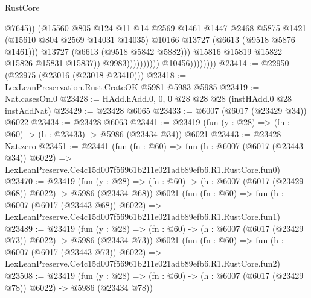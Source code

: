 \begin{lexlean}{RustCore}
\begin{coremodule}
                                                  @7645))
                                              (@15560
                                                @805
                                                @124
                                                @11
                                                @14
                                                @2569
                                                @1461
                                                @1447
                                                @2468
                                                @5875
                                                @1421
                                                (@15610 @804 @2569 @14031 @14035)
                                                @10166
                                                @13727
                                                (@6613 (@9518 @5876 @1461)))
                                              @13727
                                              (@6613 (@9518 @5842 @5882)))
                                            @15816
                                            @15819
                                            @15822
                                            @15826
                                            @15831
                                            @15837))
                                        @9983))))))))))
                    @10456))))))))
@23414 := @22950 (@22975 (@23016 (@23018 @23410)))
@23418 := LexLeanPreservation.Rust.CrateOK @5981 @5983 @5985
@23419 := Nat.casesOn.{0}
@23428 := HAdd.hAdd.{0, 0, 0} @28 @28 @28 (instHAdd.{0} @28 instAddNat)
@23429 := @23428 @6065
@23433 := @6007 (@6017 (@23429 @34)) @6022
@23434 := @23428 @6063
@23441 := @23419 (fun (y : @28) => (fn : @60) -> (h : @23433) -> @5986 (@23434 @34)) @6021
@23443 := @23428 Nat.zero
@23451 := @23441
    (fun (fn : @60) =>
    fun (h : @6007 (@6017 (@23443 @34)) @6022) =>
    LexLeanPreserve.Ce4c15d007f56961b211e021adb89efb6.R1.RustCore.fun0)
@23470 := @23419
    (fun (y : @28) => (fn : @60) -> (h : @6007 (@6017 (@23429 @68)) @6022) -> @5986 (@23434 @68))
    @6021
    (fun (fn : @60) =>
    fun (h : @6007 (@6017 (@23443 @68)) @6022) =>
    LexLeanPreserve.Ce4c15d007f56961b211e021adb89efb6.R1.RustCore.fun1)
@23489 := @23419
    (fun (y : @28) => (fn : @60) -> (h : @6007 (@6017 (@23429 @73)) @6022) -> @5986 (@23434 @73))
    @6021
    (fun (fn : @60) =>
    fun (h : @6007 (@6017 (@23443 @73)) @6022) =>
    LexLeanPreserve.Ce4c15d007f56961b211e021adb89efb6.R1.RustCore.fun2)
@23508 := @23419
    (fun (y : @28) => (fn : @60) -> (h : @6007 (@6017 (@23429 @78)) @6022) -> @5986 (@23434 @78))

\end{coremodule}
\end{lexlean}
